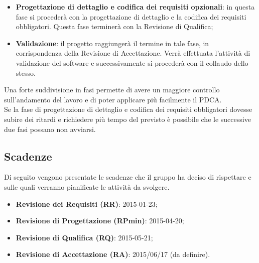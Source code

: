 \begin{itemize}
			\item \textbf{Progettazione di dettaglio e codifica dei requisiti opzionali}: in questa fase si procederà con la progettazione di dettaglio e la codifica dei requisiti obbligatori. Questa fase terminerà con la Revisione di Qualifica;
			
			\item \textbf{Validazione}: il progetto raggiungerà il termine in tale fase, in corrispondenza della Revisione di Accettazione. Verrà effettuata l’attività di validazione del software e successivamente si procederà con il collaudo dello stesso.
		\end{itemize}
\noindent
	Una forte suddivisione in fasi permette di avere un maggiore controllo sull'andamento del lavoro e di poter applicare più facilmente il PDCA. \\
	Se la fase di progettazione di dettaglio e codifica dei requisiti obbligatori dovesse subire dei ritardi e richiedere più tempo del previsto è possibile che le successive due fasi possano non avviarsi.

	\subsection{Scadenze}
	Di seguito vengono presentate le scadenze che il gruppo \groupName{} ha deciso di rispettare e sulle quali verranno pianificate le attività da svolgere.
		\begin{itemize}
			\item \textbf{Revisione dei Requisiti (RR)}: 2015-01-23;
			\item \textbf{Revisione di Progettazione (RPmin)}: 2015-04-20;
			\item \textbf{Revisione di Qualifica (RQ)}: 2015-05-21;
			\item \textbf{Revisione di Accettazione (RA)}: 2015/06/17 (da definire).
		\end{itemize}